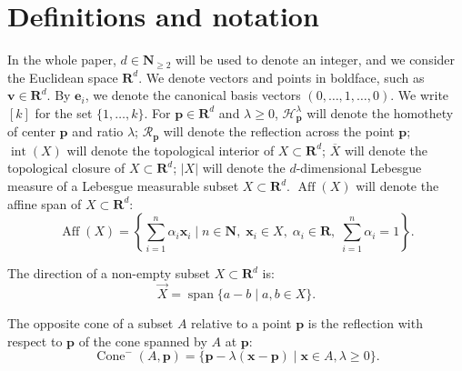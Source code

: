 \documentclass[10pt]{amsart}
\newcommand{\R}{\mathbf{R}}
\newcommand{\N}{\mathbf{N}}
\newcommand{\aff}{\operatorname{Aff}}
\newcommand{\ocone}[2]{\operatorname{Cone}^-(#1,#2)}
\begin{document}
\section{Definitions and notation}\label{sec: notation}

In the whole paper, $d\in \N_{\geq 2}$ will be used to denote an integer, and we consider the Euclidean space $\R^d$. We denote vectors and points in boldface, such as $\mathbf{v}\in \R^d$. By $\mathbf{e}_i$, we denote the canonical basis vectors $(0,\dots,1,\dots, 0)$. We write $[k]$ for the set $\{1,\dots,k\}$. For $\mathbf{p}\in \R^d$ and $\lambda\geq 0$, $\mathcal{H}_\mathbf{p}^\lambda$ will denote the homothety of center $\mathbf{p}$ and ratio $\lambda$; $\mathcal{R}_\mathbf{p}$ will denote the reflection across the point $\mathbf{p}$; $\operatorname{int}(X)$ will denote the topological interior of $X\subset \R^d$; $\overline{X}$ will denote the topological closure of $X\subset \R^d$; $|X|$ will denote the $d$-dimensional Lebesgue measure of a Lebesgue measurable subset $X\subset \R^d$. $\aff(X)$ will denote the affine span of $X\subset \R^d$:
\begin{equation*}
    \aff(X)=\left\{\sum_{i=1}^n\alpha_i\mathbf{x}_i\mid n\in \N,\;\mathbf{x}_i\in X,\;\alpha_i\in \R,\; \sum_{i=1}^n\alpha_i=1\right\}.
\end{equation*}

The direction of a non-empty subset $X\subset \R^d$ is:
\begin{equation*}
     \overrightarrow{X}= \operatorname{span}\{a-b\mid a,b\in X\}.
\end{equation*}

The opposite cone of a subset $A$ relative to a point $\mathbf{p}$ is the reflection with respect to $\mathbf{p}$ of the cone spanned by $A$ at $\mathbf{p}$:
\begin{equation}\label{eq:opposite_cone} \ocone{A}{\mathbf{p}} = \{ \mathbf{p} - \lambda(\mathbf{x}-\mathbf{p})\mid\mathbf{x} \in A, \lambda \geq 0\}.
\end{equation}
\end{document}
